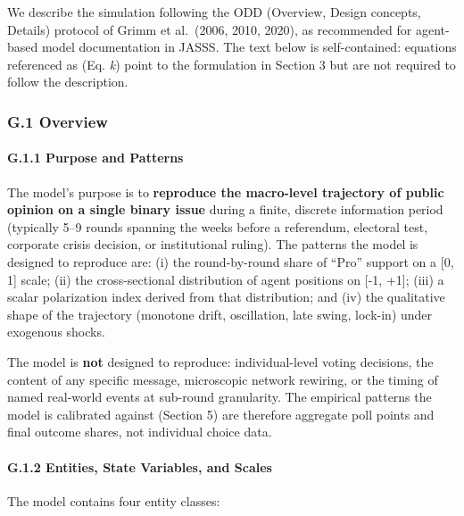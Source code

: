 \documentclass[
]{article}
\begin{document}
We describe the simulation following the ODD (Overview, Design concepts,
Details) protocol of Grimm et al.~(2006, 2010, 2020), as recommended for
agent-based model documentation in JASSS. The text below is
self-contained: equations referenced as (Eq. \emph{k}) point to the
formulation in Section 3 but are not required to follow the description.

\subsubsection{G.1 Overview}\label{g.1-overview}

\paragraph{G.1.1 Purpose and Patterns}\label{g.1.1-purpose-and-patterns}

The model's purpose is to \textbf{reproduce the macro-level trajectory
of public opinion on a single binary issue} during a finite, discrete
information period (typically 5--9 rounds spanning the weeks before a
referendum, electoral test, corporate crisis decision, or institutional
ruling). The patterns the model is designed to reproduce are: (i) the
round-by-round share of ``Pro'' support on a {[}0, 1{]} scale; (ii) the
cross-sectional distribution of agent positions on {[}-1, +1{]}; (iii) a
scalar polarization index derived from that distribution; and (iv) the
qualitative shape of the trajectory (monotone drift, oscillation, late
swing, lock-in) under exogenous shocks.

The model is \textbf{not} designed to reproduce: individual-level voting
decisions, the content of any specific message, microscopic network
rewiring, or the timing of named real-world events at sub-round
granularity. The empirical patterns the model is calibrated against
(Section 5) are therefore aggregate poll points and final outcome
shares, not individual choice data.

\paragraph{G.1.2 Entities, State Variables, and
Scales}\label{g.1.2-entities-state-variables-and-scales}

The model contains four entity classes:
\end{document}
